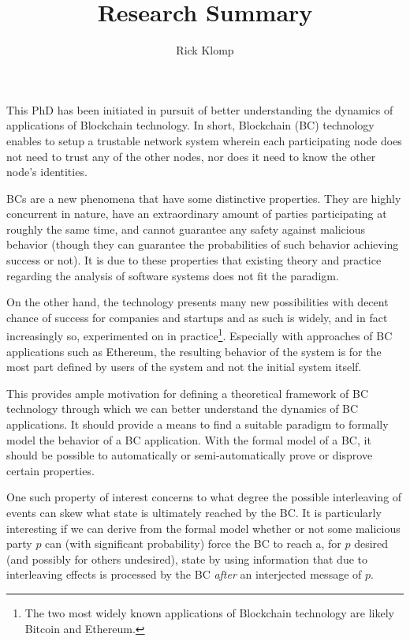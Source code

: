\documentclass[]{article}
\title{Research Summary}
\author{Rick Klomp}
\begin{document}
\maketitle

This PhD has been initiated in pursuit of better understanding the dynamics of applications of Blockchain technology. In short, Blockchain (BC) technology enables to setup a trustable network system wherein each participating node does not need to trust any of the other nodes, nor does it need to know the other node's identities.

BCs are a new phenomena that have some distinctive properties. They are highly concurrent in nature, have an extraordinary amount of parties participating at roughly the same time, and cannot guarantee any safety against malicious behavior (though they can guarantee the probabilities of such behavior achieving success or not). It is due to these properties that existing theory and practice regarding the analysis of software systems does not fit the paradigm.

On the other hand, the technology presents many new possibilities with decent chance of success for companies and startups and as such is widely, and in fact increasingly so, experimented on in practice\footnote{
	The two most widely known applications of Blockchain technology are likely Bitcoin and Ethereum.
}. Especially with approaches of BC applications such as Ethereum, the resulting behavior of the system is for the most part defined by users of the system and not the initial system itself.

This provides ample motivation for defining a theoretical framework of BC technology through which we can better understand the dynamics of BC applications. It should provide a means to find a suitable paradigm to formally model the behavior of a BC application. With the formal model of a BC, it should be possible to automatically or semi-automatically prove or disprove certain properties.

One such property of interest concerns to what degree the possible interleaving of events can skew what state is ultimately reached by the BC. It is particularly interesting if we can derive from the formal model whether or not some malicious party $p$ can (with significant probability) force the BC to reach a, for $p$ desired (and possibly for others undesired), state by using information that due to interleaving effects is processed by the BC \emph{after} an interjected message of $p$.
\end{document}
